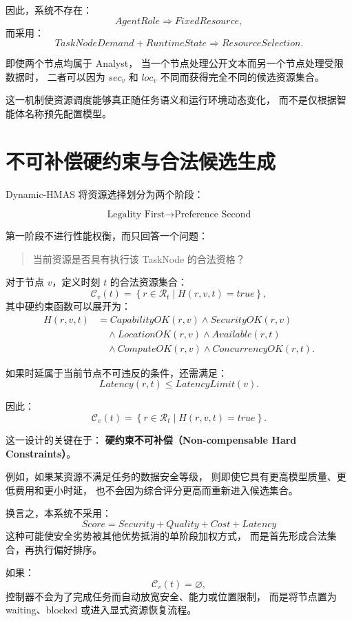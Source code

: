 \documentclass[UTF8,a4paper,12pt,oneside]{ctexbook}
\begin{document}
因此，系统不存在：
\[
AgentRole
\Rightarrow
FixedResource,
\]
而采用：
\[
TaskNodeDemand
+
RuntimeState
\Rightarrow
ResourceSelection.
\]

即使两个节点均属于 Analyst，
当一个节点处理公开文本而另一个节点处理受限数据时，
二者可以因为 $sec_v$ 和 $loc_v$ 不同而获得完全不同的候选资源集合。

这一机制使资源调度能够真正随任务语义和运行环境动态变化，
而不是仅根据智能体名称预先配置模型。


\section{不可补偿硬约束与合法候选生成}

Dynamic-HMAS 将资源选择划分为两个阶段：

\[
\boxed{
\text{Legality First}
\rightarrow
\text{Preference Second}
}
\]

第一阶段不进行性能权衡，而只回答一个问题：

\begin{quote}
当前资源是否具有执行该 TaskNode 的合法资格？
\end{quote}

对于节点 $v$，定义时刻 $t$ 的合法资源集合：
\[
\mathcal{C}_v(t)
=
\left\{
r\in\mathcal{R}_t
\mid
H(r,v,t)=true
\right\},
\]
其中硬约束函数可以展开为：
\[
\begin{aligned}
H(r,v,t)
&= CapabilityOK(r,v) \land SecurityOK(r,v) \\[3pt]
&\quad {}\land LocationOK(r,v) \land Available(r,t) \\[3pt]
&\quad {}\land ComputeOK(r,v) \land ConcurrencyOK(r,t).
\end{aligned}
\]

如果时延属于当前节点不可违反的条件，还需满足：
\[
Latency(r,t)\leq LatencyLimit(v).
\]

因此：
\[
\mathcal{C}_v(t)
=
\left\{
r\in\mathcal{R}_t
\mid
H(r,v,t)=true
\right\}.
\]

这一设计的关键在于：
\textbf{硬约束不可补偿（Non-compensable Hard Constraints）}。

例如，如果某资源不满足任务的数据安全等级，
则即使它具有更高模型质量、更低费用和更小时延，
也不会因为综合评分更高而重新进入候选集合。

换言之，本系统不采用：
\[
Score
=
Security
+
Quality
+
Cost
+
Latency
\]
这种可能使安全劣势被其他优势抵消的单阶段加权方式，
而是首先形成合法集合，再执行偏好排序。

如果：
\[
\mathcal{C}_v(t)=\varnothing,
\]
控制器不会为了完成任务而自动放宽安全、能力或位置限制，
而是将节点置为 waiting、blocked 或进入显式资源恢复流程。
\end{document}
